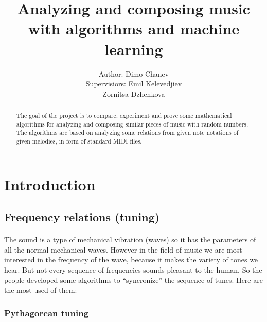 \documentclass[]{article}
\title{Analyzing and composing music with algorithms and machine learning}
\author{
    \begin{tabular}{rl}
        \normalsize{Author: } & \normalsize{Dimo Chanev} \\
        \scriptsize{Supervisiors: } & \scriptsize{Emil Kelevedjiev}\\
                                    & \scriptsize{Zornitsa Dzhenkova}
    \end{tabular}
}
\begin{document}
    \maketitle
    \newpage

    \tableofcontents

    \newpage
    \begin{abstract}
        The goal of the project is to compare, experiment and prove some mathematical algorithms for analyzing and composing similar pieces of music with random numbers. The algorithms are based on analyzing some relations from given note notations of given melodies, in form of standard MIDI files.
    \end{abstract}

    \newpage

    \section{Introduction}
        \subsection {Frequency relations (tuning)}
        \paragraph{} The sound is a type of mechanical vibration (waves) so it has the parameters of all the normal mechanical waves. However in the field of music we are most interested in the frequency of the wave, because it makes the variety of tones we hear. But not every sequence of frequencies sounds pleasant to the human. So the people developed some algorithms to ``syncronize'' the sequence of tunes. Here are the most used of them:

            \subsubsection {Pythagorean tuning} 
\end{document}
